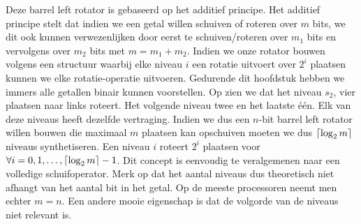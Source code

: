 Deze barrel left rotator is gebaseerd op het additief principe. Het additief principe stelt dat indien we een getal willen schuiven of roteren over $m$ bits, we dit ook kunnen verwezenlijken door eerst te schuiven/roteren over $m_1$ bits en vervolgens over $m_2$ bits met $m=m_1+m_2$. Indien we onze rotator bouwen volgens een structuur waarbij elke niveau $i$ een rotatie uitvoert over $2^i$ plaatsen kunnen we elke rotatie-operatie uitvoeren. Gedurende dit hoofdstuk hebben we immers alle getallen binair kunnen voorstellen. Op  zien we dat het niveau $s_2$, vier plaatsen naar links roteert. Het volgende niveau twee en het laatste \'e\'en. Elk van deze niveaus heeft dezelfde vertraging. Indien we dus een $n$-bit barrel left rotator willen bouwen die maximaal $m$ plaatsen kan opschuiven moeten we dus $\left\lceil \log_2m \right\rceil$ niveaus synthetiseren. Een niveau $i$ roteert $2^i$ plaatsen voor $\forall i=0,1,\ldots,\left\lceil \log_2m \right\rceil-1$. Dit concept is eenvoudig te veralgemenen naar een volledige schuifoperator. Merk op dat het aantal niveaus dus theoretisch niet afhangt van het aantal bit in het getal. Op de meeste processoren neemt men echter $m=n$. Een andere mooie eigenschap is dat de volgorde van de niveaus niet relevant is.
